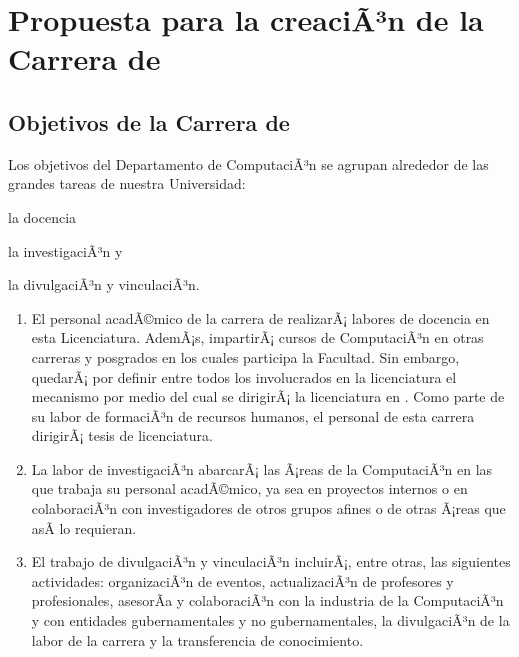 \section{Propuesta para la creaciÃ³n de la Carrera de \SchoolShortName}\label{sec:cs-prop-carr-cscomp}

\subsection{Objetivos de la Carrera de \SchoolShortName}
Los objetivos del Departamento de ComputaciÃ³n se agrupan alrededor de las grandes tareas de nuestra Universidad:
\begin{inparaenum}[ a) ]
\item la docencia
\item la investigaciÃ³n y 
\item la divulgaciÃ³n y vinculaciÃ³n.
\end{inparaenum}

\begin{enumerate}
\item El personal acadÃ©mico de la carrera de \SchoolShortName realizarÃ¡ labores de docencia en esta Licenciatura. AdemÃ¡s, impartirÃ¡ cursos de ComputaciÃ³n en otras carreras y posgrados en los cuales participa la Facultad. Sin embargo, quedarÃ¡ por definir entre todos los involucrados en la licenciatura el mecanismo por medio del cual se dirigirÃ¡ la licenciatura en \SchoolShortName. Como parte de su labor de formaciÃ³n de recursos humanos, el personal de esta carrera dirigirÃ¡ tesis de licenciatura.

\item La labor de investigaciÃ³n abarcarÃ¡ las Ã¡reas de la ComputaciÃ³n en las que trabaja su personal acadÃ©mico, ya sea en proyectos internos o en colaboraciÃ³n con investigadores de otros grupos afines o de otras Ã¡reas que asÃ­ lo requieran.

\item El trabajo de divulgaciÃ³n y vinculaciÃ³n incluirÃ¡, entre otras, las siguientes actividades: organizaciÃ³n de eventos, actualizaciÃ³n de profesores y profesionales, asesorÃ­a y colaboraciÃ³n con la industria de la ComputaciÃ³n y con entidades gubernamentales y no gubernamentales, la divulgaciÃ³n de la labor de la carrera y la transferencia de conocimiento.
\end{enumerate}

